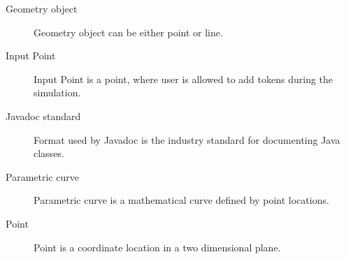 \begin{description}
\item [Geometry object] Geometry object can be either point or line.

\item [Input Point] Input Point is a point, where user is allowed to add tokens during the simulation.

\item [Javadoc standard] Format used by Javadoc is the industry standard for documenting Java classes.

\item [Parametric curve] Parametric curve is a mathematical curve defined by point locations.

\item [Point] Point is a coordinate location in a two dimensional plane.

 \end{description}

